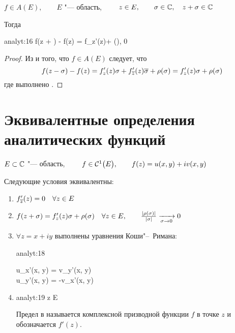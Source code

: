 \begin{statement}
	$ f \in A(E), \qquad E $ "--- область, $ \qquad z \in E, \qquad \sigma \in \Co, \quad z + \sigma \in \Co $

	Тогда
	\begin{equ}{analyt:16}
		f(z + \sigma) - f(z) = f_z'(z)\sigma + \rho(\sigma), \qquad \frac{|\rho(\sigma)|}{|\sigma|}  0
	\end{equ}
\end{statement}

\begin{proof}
	Из  и того, что $ f \in A(E) $ следует, что
	$$ f(z - \sigma) - f(z) = f_z'(z)\sigma + f_{\ol z}'(z)\ol \sigma + \rho(\sigma) = f_z'(z)\sigma + \rho(\sigma) $$
	где выполнено .
\end{proof}

\section{Эквивалентные определения аналитических функций}

\begin{theorem}
	$ E \sub \Co $ "--- область, $ \qquad f \in \Cont[1] E, \qquad f(z) = u(x, y) + iv(x, y) $

	Следующие условия эквивалентны:
	\begin{enumerate}
		\item $ f_{\ol z}'(z) = 0 \quad \forall z \in E $
		\item $ f(z + \sigma) = f_z'(z)\sigma + \rho(\sigma) \quad \forall z \in E, \qquad \frac{|\rho(\sigma)|}{|\sigma|} \underarr{\sigma \to 0} 0 $
		\item $ \forall z = x + iy $ выполнены уравнения Коши"--~Римана:
		\begin{equ}{analyt:18}
			\begin{rcases}
				u_x'(x, y) = v_y'(x, y) \\
				u_y'(x, y) = -v_x'(x, y)
			\end{rcases}
		\end{equ}
		\item
		\begin{equ}{analyt:19}
			\forall z \in E \quad \exist \limz\sigma {}\sigma \in \Co
		\end{equ}
		Предел в  называется комплексной призводной функции $ f $ в точке $ z $ и обозначается $ f'(z) $.
	\end{enumerate}
\end{theorem}

